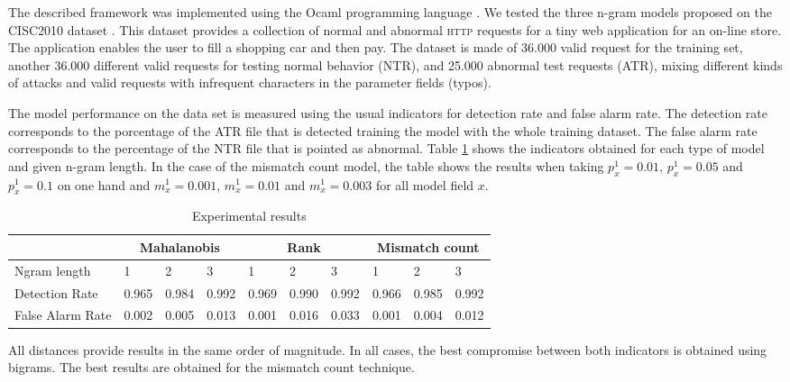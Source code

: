 \documentclass[runningheads,a4paper]{llncs}
\newcommand{\HTTP}{\textsc{http}\xspace}
\begin{document}
The described framework was implemented using the Ocaml programming language \cite{wafngram}. We tested the three n-gram models proposed on the CISC2010 dataset \cite{CISC2010Dataset}. This dataset provides a collection of normal and abnormal \HTTP requests for a tiny web application for an on-line store. The application enables the user to fill a shopping car and then pay. The dataset is made of 36.000 valid request for the training set, another 36.000 different valid requests for testing normal behavior (NTR), and 25.000 abnormal test requests (ATR), mixing different kinds of attacks and valid requests with infrequent characters in the parameter fields (typos).

The model performance on the data set is measured using the usual indicators for detection rate and false alarm rate. The detection rate corresponds to the porcentage of the ATR file that is detected training the model with the whole training dataset. The false alarm rate corresponds to the percentage of the NTR file that is pointed as abnormal. Table \ref{ExperimentalResults} shows the indicators obtained for each type of model and given n-gram length. In the case of the mismatch count model, the table shows the results when taking $p^1_x = 0.01$, $p^1_x = 0.05$ and $p^1_x = 0.1$ on one hand and $m^1_x=0.001$, $m^1_x=0.01$ and $m^1_x=0.003$ for all model field $x$. 
 
\begin{table}[]
\centering
\label{ExperimentalResults}
\begin{tabular}{|l|l|l|l|l|l|l|l|l|l|}
\hline
& \multicolumn{3}{c}{\textbf{Mahalanobis}} \vline & \multicolumn{3}{c}{\textbf{Rank}}\vline  & \multicolumn{3}{c}{\textbf{Mismatch count}} \vline\\
\hline
\hline
       Ngram length       &  1   &    2   &   3   &   1   &   2   &   3   &    1  &    2  &    3   \\    
\hline
       Detection Rate    & 0.965 & 0.984 & 0.992 & 0.969 & 0.990 & 0.992 & 0.966 & 0.985 &  0.992  \\  %
\hline
       False Alarm Rate  & 0.002 & 0.005 & 0.013 & 0.001 & 0.016 & 0.033 & 0.001 & 0.004 &  0.012  \\  %
\hline
\end{tabular}
\caption{Experimental results}
\end{table}
All distances provide results in the same order of magnitude. In all cases, the best compromise between both indicators is obtained using bigrams. The best results are obtained for the mismatch count technique. 
\end{document}
